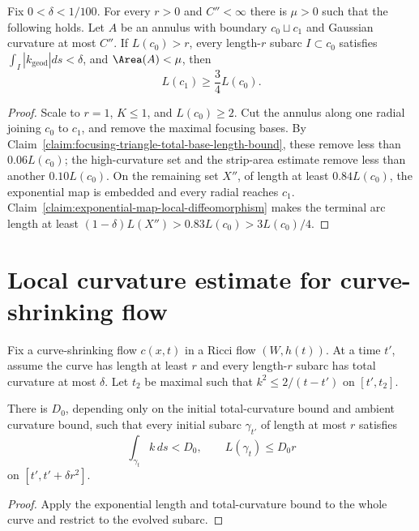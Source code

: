 \begin{proposition}
\label{prop:annulus-boundary-length-estimate}
\label{annlengthest}
Fix $0<\delta<1/100$. For every $r>0$ and $C''<\infty$ there is $\mu>0$ such
that the following holds. Let $A$ be an annulus with boundary $c_0\sqcup c_1$
and Gaussian curvature at most $C''$. If $L(c_0)>r$, every length-$r$ subarc
$I\subset c_0$ satisfies $\int_I|k_{\mathrm{geod}}|ds<\delta$, and
$\Area(A)<\mu$, then
\[
L(c_1)\ge\frac34L(c_0).
\]
\end{proposition}
\begin{proof}
\sketch Scale to $r=1$, $K\le1$, and $L(c_0)\ge2$. Cut the annulus along one
radial joining $c_0$ to $c_1$, and remove the maximal focusing bases. By
Claim~\ref{claim:focusing-triangle-total-base-length-bound}, these remove less
than $0.06L(c_0)$; the high-curvature set and the strip-area estimate remove
less than another $0.10L(c_0)$. On the remaining set $X''$, of length at least
$0.84L(c_0)$, the exponential map is embedded and every radial reaches $c_1$.
Claim~\ref{claim:exponential-map-local-diffeomorphism} makes the terminal arc
length at least $(1-\delta)L(X'')>0.83L(c_0)>3L(c_0)/4$.
\end{proof}

\section{Local curvature estimate for curve-shrinking flow}
\label{18.6}

Fix a curve-shrinking flow $c(x,t)$ in a Ricci flow $(W,h(t))$. At a time
$t'$, assume the curve has length at least $r$ and every length-$r$ subarc has
total curvature at most $\delta$. Let $t_2$ be maximal such that
$k^2\le2/(t-t')$ on $[t',t_2]$.

\begin{claim}
\label{claim:curve-shrinking-length-curvature-uniform-bound}
\label{C0claim}
There is $D_0$, depending only on the initial total-curvature bound and ambient
curvature bound, such that every initial subarc $\gamma_{t'}$ of length at most
$r$ satisfies
\[
\int_{\gamma_t}k\,ds<D_0,
\qquad L(\gamma_t)\le D_0r
\]
on $[t',t'+\delta r^2]$.
\end{claim}
\begin{proof}
\sketch Apply the exponential length and total-curvature bound to the whole curve and
restrict to the evolved subarc.
\end{proof}

